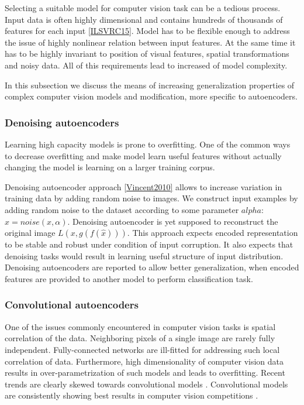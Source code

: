 Selecting a suitable model for computer vision task can be a tedious process.
Input data is often highly dimensional and contains hundreds of thousands of features for each input \ref{ILSVRC15}.
Model has to be flexible enough to address the issue of highly nonlinear relation between input features.
At the same time it has to be highly invariant to position of visual features, spatial transformations and noisy data.
All of this requirements lead to increased of model complexity.

In this subsection we discuss the means of increasing generalization properties of complex computer vision models and modification, more specific to autoencoders.

\subsubsection{Denoising autoencoders}

Learning high capacity models is prone to overfitting.
One of the common ways to decrease overfitting and make model learn useful features without actually changing the model is learning on a larger training corpus.

Denoising autoencoder approach \ref{Vincent2010} allows to increase variation in training data by adding random noise to images. We construct input examples by adding random noise to the dataset according to some parameter $alpha$: $\hat{x}=noise(x, \alpha)$.
Denoising autoencoder is yet supposed to reconstruct  the original image $L(x, g(f(\hat{x})))$.
This approach expects encoded representation to be stable and robust under condition of input corruption.
It also expects that denoising tasks would result in learning useful structure of input distribution.
Denoising autoencoders are reported to allow better generalization, when encoded features are provided to another model to perform classification task.

\subsubsection{Convolutional autoencoders}

One of the issues commonly encountered in computer vision tasks is spatial correlation of the data.
Neighboring pixels of a single image are rarely fully independent.
Fully-connected networks are ill-fitted for addressing such local correlation of data.
Furthermore, high dimensionality of computer vision data results in over-parametrization of such models and leads to overfitting.
Recent trends are clearly skewed towards convolutional models \cite{He2015, Szegedy2016}.
Convolutional models are consistently showing best results in computer vision competitions \cite{ILSVRC15, Zhou2016}.

